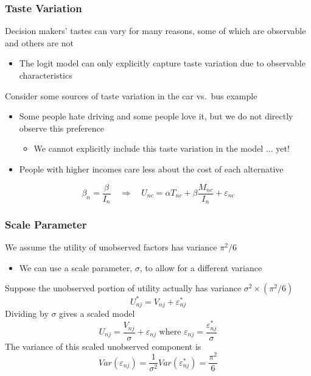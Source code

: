 \documentclass{beamer}
\begin{document}
\begin{frame}\frametitle{Taste Variation}
    Decision makers' tastes can vary for many reasons, some of which are observable and others are not
    \begin{itemize}
    	\item The logit model can only explicitly capture taste variation due to observable characteristics 
    \end{itemize}
    \vspace{2ex}
    Consider some sources of taste variation in the car vs.\ bus example
    \begin{itemize}
    	\item Some people hate driving and some people love it, but we do not directly observe this preference
    	\begin{itemize}
    		\item We cannot explicitly include this taste variation in the model $\ldots$ yet!
    	\end{itemize}
    	\item People with higher incomes care less about the cost of each alternative
    \end{itemize}
    $$\beta_n = \frac{\beta}{I_n} \quad \Rightarrow \quad U_{nc} = \alpha T_{nc} + \beta \frac{M_{nc}}{I_n} + \varepsilon_{nc}$$
\end{frame}

\begin{frame}\frametitle{Scale Parameter}
    We assume the utility of unobserved factors has variance $\pi^2 / 6$
    \begin{itemize}
    	\item We can use a scale parameter, $\sigma$, to allow for a different variance \\
    \end{itemize}
    \vspace{2ex}
    Suppose the unobserved portion of utility actually has variance $\sigma^2 \times (\pi^2 / 6)$
    $$U_{nj}^* = V_{nj} + \varepsilon_{nj}^*$$
    Dividing by $\sigma$ gives a scaled model
    $$U_{nj} = \frac{V_{nj}}{\sigma} + \varepsilon_{nj} \text{ where } \varepsilon_{nj} = \frac{\varepsilon_{nj}^*}{\sigma}$$
    The variance of this scaled unobserved component is
    $$Var(\varepsilon_{nj}) = \frac{1}{\sigma^2} Var(\varepsilon_{nj}^*) = \frac{\pi^2}{6}$$
\end{frame}
\end{document}
